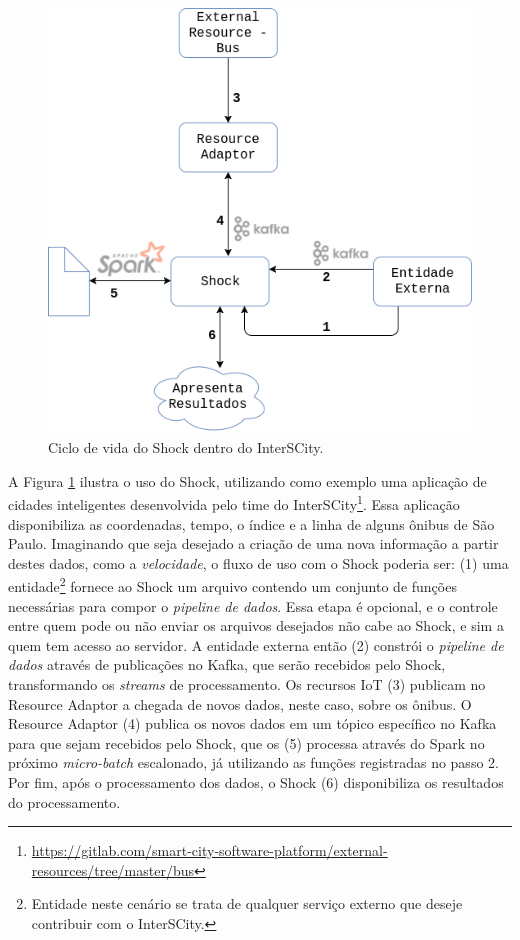 \begin{figure}
  \centering
    \includegraphics[scale=0.45]{figuras/shock.png}
    \caption{Ciclo de vida do Shock dentro do InterSCity.}
  \label{fig:shock}
\end{figure}

A Figura \ref{fig:shock} ilustra o uso do Shock, utilizando como exemplo uma
aplicação de cidades inteligentes desenvolvida pelo time do
InterSCity\footnote{\url{https://gitlab.com/smart-city-software-platform/external-resources/tree/master/bus}}.
Essa aplicação disponibiliza as coordenadas, tempo, o índice e a linha de alguns
ônibus de São Paulo. Imaginando que seja desejado a criação de uma nova informação
a partir destes dados, como a \textit{velocidade}, o fluxo de uso com o Shock
poderia ser: (1) uma
entidade\footnote{Entidade neste cenário se trata de qualquer serviço externo que deseje
contribuir com o InterSCity.} fornece ao Shock um arquivo contendo um conjunto
de funções necessárias para compor o \textit{pipeline de dados}. Essa etapa é
opcional, e o controle entre quem pode ou não enviar os arquivos desejados não
cabe ao Shock, e sim a quem tem acesso ao servidor. A entidade externa então
(2) constrói o \textit{pipeline de dados} através de publicações no Kafka, que
serão recebidos pelo Shock, transformando os \textit{streams} de processamento.
Os recursos IoT (3) publicam no Resource Adaptor a chegada de novos dados,
neste caso, sobre os ônibus. O Resource Adaptor (4) publica os novos dados em um
tópico específico no Kafka para que sejam recebidos pelo Shock, que os (5)
processa através do Spark no próximo \textit{micro-batch} escalonado, já
utilizando as funções registradas no passo 2. Por fim, após o processamento
dos dados, o Shock (6) disponibiliza os resultados do processamento.
